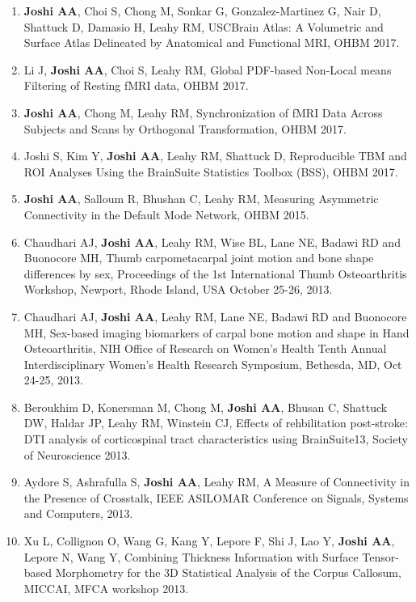 \documentclass[overlapped,line,letterpaper]{res}
\begin{document}
\begin{resume}
\begin{enumerate}
    \item \textbf{Joshi AA}, Choi S, Chong M, Sonkar G, Gonzalez-Martinez G, Nair D, Shattuck D,  Damasio H, Leahy RM, {USCBrain Atlas: A Volumetric and Surface Atlas Delineated by Anatomical and Functional MRI}, OHBM 2017.

    \item Li J, \textbf{Joshi AA}, Choi S, Leahy RM, {Global PDF-based Non-Local means Filtering of Resting fMRI data}, OHBM 2017.

    \item \textbf{Joshi AA}, Chong M, Leahy RM, {Synchronization of fMRI Data Across Subjects and Scans by Orthogonal Transformation}, OHBM 2017.

    \item Joshi S, Kim Y, \textbf{Joshi AA}, Leahy RM,  Shattuck D, {Reproducible TBM and ROI Analyses Using the BrainSuite Statistics Toolbox (BSS)}, OHBM 2017.

    \item \textbf{Joshi AA}, Salloum R, Bhushan C, Leahy RM, {Measuring Asymmetric Connectivity in the Default Mode Network}, OHBM 2015.

    \item Chaudhari AJ, \textbf{Joshi AA}, Leahy RM, Wise BL, Lane NE, Badawi RD and Buonocore MH, {Thumb carpometacarpal joint motion and bone shape differences by sex}, Proceedings of the 1st International Thumb Osteoarthritis Workshop, Newport, Rhode Island, USA October 25-26, 2013.

    \item Chaudhari AJ, \textbf{Joshi AA}, Leahy RM, Lane NE, Badawi RD and Buonocore MH, {Sex-based imaging biomarkers of carpal bone motion and shape in Hand Osteoarthritis}, NIH Office of Research on Women's Health Tenth Annual Interdisciplinary Women's Health Research Symposium, Bethesda, MD, Oct 24-25, 2013.

    \item Beroukhim D, Konersman M, Chong M, \textbf{Joshi AA}, Bhusan C, Shattuck DW, Haldar JP, Leahy RM, Winstein CJ, {Effects of rehbilitation post-stroke: DTI analysis of corticospinal tract characteristics using BrainSuite13}, Society of Neuroscience 2013.

    \item Aydore S, Ashrafulla S, \textbf{Joshi AA}, Leahy RM, {A Measure of Connectivity in the Presence of Crosstalk}, IEEE ASILOMAR Conference on Signals, Systems and Computers, 2013.

    \item Xu L, Collignon O, Wang G, Kang Y, Lepore F, Shi J, Lao Y, \textbf{Joshi AA}, Lepore N, Wang Y, {Combining Thickness Information with Surface Tensor-based Morphometry for the 3D Statistical Analysis of the Corpus Callosum}, MICCAI, MFCA workshop 2013.


\end{enumerate}
\end{resume}
\end{document}
